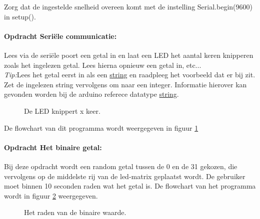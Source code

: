 Zorg dat de ingestelde snelheid overeen komt met de instelling \textcolor{BurntOrange}{Serial.begin}(9600) in  \textcolor{OliveGreen}{setup}(). 

\newpage
\paragraph{Opdracht Seriële communicatie:} \label{blad:aantalknipper}
Lees via de seriële poort een getal in en laat een LED het aantal keren knipperen zoals het ingelezen getal. Lees hierna opnieuw een getal in, etc...\\
\textit{Tip:}Lees het getal eerst in als een \href{https://docs.arduino.cc/language-reference/en/functions/communication/serial/readString/}{string} en raadpleeg het voorbeeld dat er bij zit. Zet de ingelezen string vervolgens om naar een integer. Informatie hierover kan gevonden worden bij de arduino referece datatype \href{https://www.arduino.cc/reference/tr/language/variables/data-types/stringobject/}{string}.
\begin{figure}[H]
	\captionsetup{justification=centering}
	\centering
	\eerstefc

	\caption{De LED knippert x keer.}
	\label{fig:flowchart1}
\end{figure}
De flowchart van dit programma wordt weergegeven in figuur \ref{fig:flowchart1}

\paragraph{Opdracht Het binaire getal:} \label{blz:bineairGetal}
Bij deze opdracht wordt een random getal tussen de 0 en de 31 gekozen, die vervolgens op de middelste rij van de led-matrix geplaatst wordt. De gebruiker moet binnen 10 seconden raden wat het getal is. De flowchart van het programma wordt in figuur \ref{fig:flowchart2} weergegeven.
\begin{figure}[H]
	\captionsetup{justification=centering}
	\centering
	\randomfc
	
	\caption{Het raden van de binaire waarde.}
	\label{fig:flowchart2}
\end{figure}
